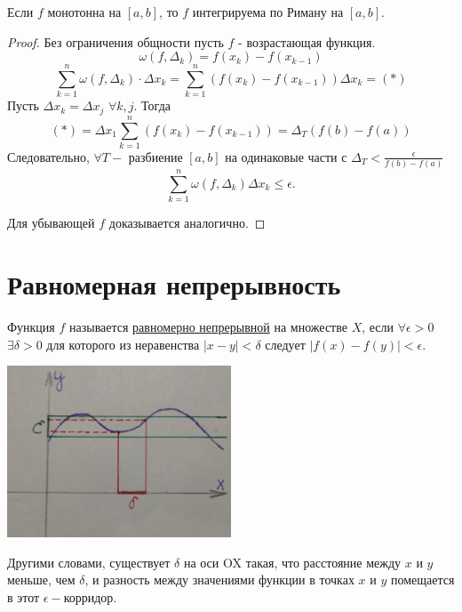     \begin{corollary}
    	Если $f$ монотонна на $[a, b]$, то $f$ интегрируема по Риману на $[a, b]$.
    \end{corollary}
    
    \begin{proof}
    	Без ограничения общности пусть $f$ - возрастающая функция.
    	\[ \omega(f, \Delta_k) = f(x_k) - f(x_{k - 1}) \]
    	\[ \sum_{k = 1}^n \omega(f, \Delta_k) \cdot \Delta x_k = \sum_{k = 1}^n (f(x_k) - f(x_{k - 1})) \Delta x_k = (*) \]
    	Пусть $\Delta x_k = \Delta x_j$ $\forall k, j$. Тогда
    	\[ (*) = \Delta x_1 \sum_{k = 1}^n (f(x_k) - f(x_{k - 1})) = \Delta_T (f(b) - f(a)) \]
    	Следовательно, $\forall T -$ разбиение $[a, b]$ на одинаковые части с $\Delta_T < \frac{\epsilon}{f(b) - f(a)}$
    	\[ \sum_{k = 1}^n \omega(f, \Delta_k) \Delta x_k \leqslant \epsilon. \]
    	
        Для убывающей $f$ доказывается аналогично.
    \end{proof}
    
    \section{Равномерная непрерывность}
    
    \begin{definition}
    	\item Функция $f$ называется \underline{равномерно непрерывной} на
    	множестве $X$, если $\forall \epsilon > 0$ $\exists \delta > 0$ для которого из неравенства
    	$|x - y| < \delta$ следует $|f(x) - f(y)| < \epsilon.$
    \end{definition}
    
    \begin{center}
    	\includegraphics[width=0.5\textwidth]{img/lecture27/uniformly_continuous_function}
    \end{center}
    
    \begin{explanation}
    	Другими словами, существует $\delta$ на оси OX такая, что расстояние между $x$ и $y$ меньше, чем $\delta$, и разность между значениями функции в точках $x$ и $y$ помещается в этот $\epsilon-$корридор.
    \end{explanation}
    
